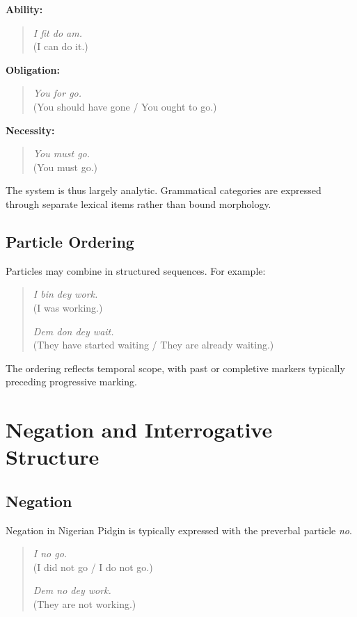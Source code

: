 \documentclass[12pt]{article}
\begin{document}
\textbf{Ability:}

\begin{quote}
\textit{I fit do am.} \\
(I can do it.)
\end{quote}

\textbf{Obligation:}

\begin{quote}
\textit{You for go.} \\
(You should have gone / You ought to go.)
\end{quote}

\textbf{Necessity:}

\begin{quote}
\textit{You must go.} \\
(You must go.)
\end{quote}

The system is thus largely analytic. Grammatical categories are expressed through separate lexical items rather than bound morphology.

\subsection{Particle Ordering}

Particles may combine in structured sequences. For example:

\begin{quote}
\textit{I bin dey work.} \\
(I was working.)

\textit{Dem don dey wait.} \\
(They have started waiting / They are already waiting.)
\end{quote}

The ordering reflects temporal scope, with past or completive markers typically preceding progressive marking.

\section{Negation and Interrogative Structure}

\subsection{Negation}

Negation in Nigerian Pidgin is typically expressed with the preverbal particle \textit{no}.

\begin{quote}
\textit{I no go.} \\
(I did not go / I do not go.)

\textit{Dem no dey work.} \\
(They are not working.)
\end{quote}
\end{document}
